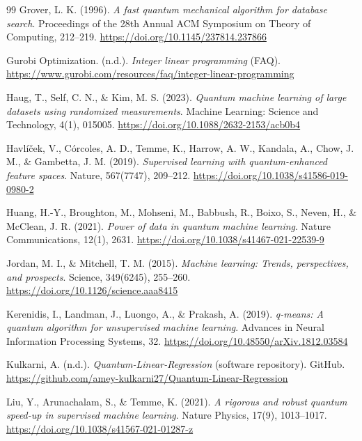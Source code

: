 \begin{thebibliography}{99}
	Grover, L. K. (1996).
	\emph{A fast quantum mechanical algorithm for database search}.
	Proceedings of the 28th Annual ACM Symposium on Theory of Computing, 212--219.
	\url{https://doi.org/10.1145/237814.237866}

	Gurobi Optimization. (n.d.).
	\emph{Integer linear programming} (FAQ).
	\url{https://www.gurobi.com/resources/faq/integer-linear-programming}

	Haug, T., Self, C. N., \& Kim, M. S. (2023).
	\emph{Quantum machine learning of large datasets using randomized measurements}.
	Machine Learning: Science and Technology, 4(1), 015005.
	\url{https://doi.org/10.1088/2632-2153/acb0b4}

	Havlíček, V., Córcoles, A. D., Temme, K., Harrow, A. W., Kandala, A., Chow, J. M., \& Gambetta, J. M. (2019).
	\emph{Supervised learning with quantum-enhanced feature spaces}.
	Nature, 567(7747), 209--212.
	\url{https://doi.org/10.1038/s41586-019-0980-2}

	Huang, H.-Y., Broughton, M., Mohseni, M., Babbush, R., Boixo, S., Neven, H., \& McClean, J. R. (2021).
	\emph{Power of data in quantum machine learning}.
	Nature Communications, 12(1), 2631.
	\url{https://doi.org/10.1038/s41467-021-22539-9}

	Jordan, M. I., \& Mitchell, T. M. (2015).
	\emph{Machine learning: Trends, perspectives, and prospects}.
	Science, 349(6245), 255--260.
	\url{https://doi.org/10.1126/science.aaa8415}

	Kerenidis, I., Landman, J., Luongo, A., \& Prakash, A. (2019).
	\emph{q-means: A quantum algorithm for unsupervised machine learning}.
	Advances in Neural Information Processing Systems, 32.
	\url{https://doi.org/10.48550/arXiv.1812.03584}

	Kulkarni, A. (n.d.).
	\emph{Quantum-Linear-Regression} (software repository).
	GitHub.
	\url{https://github.com/amey-kulkarni27/Quantum-Linear-Regression}

	Liu, Y., Arunachalam, S., \& Temme, K. (2021).
	\emph{A rigorous and robust quantum speed-up in supervised machine learning}.
	Nature Physics, 17(9), 1013--1017.
	\url{https://doi.org/10.1038/s41567-021-01287-z}


\end{thebibliography}
